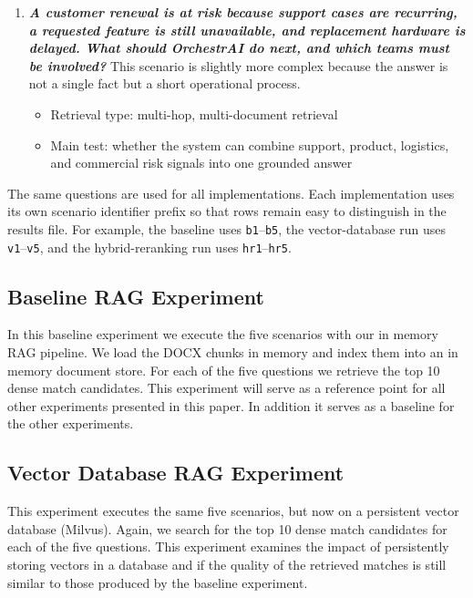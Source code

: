\begin{enumerate}
\begin{itemize}
        \end{itemize}
     \item \textbf{\textit{A customer renewal is at risk because support cases are recurring, a requested feature is still unavailable, and replacement hardware is delayed. What should OrchestrAI do next, and which teams must be involved?}} This scenario is slightly more complex because the answer is not a single fact but a short operational process.
        \begin{itemize}
            \item Retrieval type: multi-hop, multi-document retrieval
            \item Main test: whether the system can combine support, product, logistics, and commercial risk signals into one grounded answer
        \end{itemize}
\end{enumerate}

The same questions are used for all implementations. Each implementation uses its own scenario identifier prefix so that rows remain easy to distinguish in the results file. For example, the baseline uses \texttt{b1}--\texttt{b5}, the vector-database run uses \texttt{v1}--\texttt{v5}, and the hybrid-reranking run uses \texttt{hr1}--\texttt{hr5}.

\subsection{Baseline RAG Experiment}
In this baseline experiment we execute the five scenarios with our in memory \ac{RAG} pipeline. We load the DOCX chunks in memory and index them into an in memory document store. For each of the five questions we retrieve the top 10 dense match candidates. This experiment will serve as a reference point for all other experiments presented in this paper. In addition it serves as a baseline for the other experiments.

\subsection{Vector Database RAG Experiment}
This experiment executes the same five scenarios, but now on a persistent vector database (Milvus). Again, we search for the top 10 dense match candidates for each of the five questions. This experiment examines the impact of persistently storing vectors in a database and if the quality of the retrieved matches is still similar to those produced by the baseline experiment.

